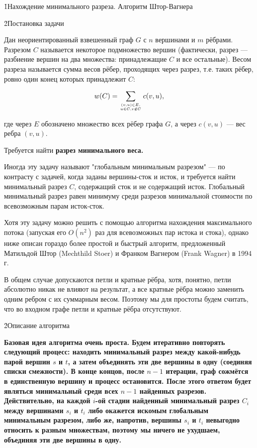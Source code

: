 \h1{Нахождение минимального разреза. Алгоритм Штор-Вагнера}


\h2{Постановка задачи}

Дан неориентированный взвешенный граф $G$ с $n$ вершинами и $m$ рёбрами. Разрезом $C$ называется некоторое подмножество вершин (фактически, разрез --- разбиение вершин на два множества: принадлежащие $C$ и все остальные). Весом разреза называется сумма весов рёбер, проходящих через разрез, т.е. таких рёбер, ровно один конец которых принадлежит $C$:

$$ w(C) = \sum_{(v,u) \in E, \atop u \in C, v \not\in C} c(v,u), $$

где через $E$ обозначено множество всех рёбер графа $G$, а через $c(v,u)$ --- вес ребра $(v,u)$.

Требуется найти \bf{разрез минимального веса}.

Иногда эту задачу называют "глобальным минимальным разрезом" --- по контрасту с задачей, когда заданы вершины-сток и исток, и требуется найти минимальный разрез $C$, содержащий сток и не содержащий исток. Глобальный минимальный разрез равен минимуму среди разрезов минимальной стоимости по всевозможным парам исток-сток.

Хотя эту задачу можно решить с помощью алгоритма нахождения максимального потока (запуская его $O(n^2)$ раз для всевозможных пар истока и стока), однако ниже описан гораздо более простой и быстрый алгоритм, предложенный Матильдой Штор (Mechthild Stoer) и Франком Вагнером (Frank Wagner) в 1994 г.

В общем случае допускаются петли и кратные рёбра, хотя, понятно, петли абсолютно никак не влияют на результат, а все кратные рёбра можно заменить одним ребром с их суммарным весом. Поэтому мы для простоты будем считать, что во входном графе петли и кратные рёбра отсутствуют.


\h2{Описание алгоритма}

\bf{Базовая идея} алгоритма очень проста. Будем итеративно повторять следующий процесс: находить минимальный разрез между какой-нибудь парой вершин $s$ и $t$, а затем объединять эти две вершины в одну (соединяя списки смежности). В конце концов, после $n-1$ итерации, граф сожмётся в единственную вершину и процесс остановится. После этого ответом будет являться минимальный среди всех $n-1$ найденных разрезов. Действительно, на каждой $i$-ой стадии найденный минимальный разрез $C_i$ между вершинами $s_i$ и $t_i$ либо окажется искомым глобальным минимальным разрезом, либо же, напротив, вершины $s_i$ и $t_i$ невыгодно относить к разным множествам, поэтому мы ничего не ухудшаем, объединяя эти две вершины в одну.

